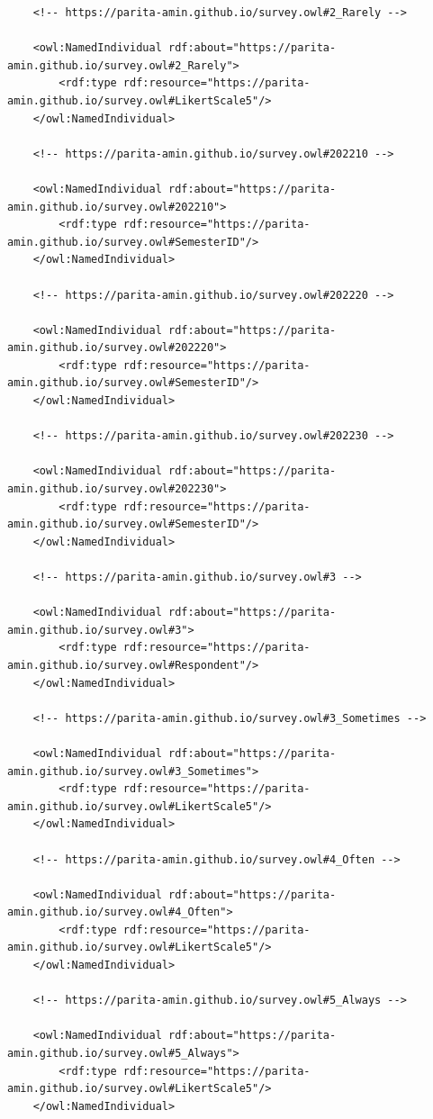 \begin{lstlisting}
    <!-- https://parita-amin.github.io/survey.owl#2_Rarely -->

    <owl:NamedIndividual rdf:about="https://parita-amin.github.io/survey.owl#2_Rarely">
        <rdf:type rdf:resource="https://parita-amin.github.io/survey.owl#LikertScale5"/>
    </owl:NamedIndividual>
    
    <!-- https://parita-amin.github.io/survey.owl#202210 -->

    <owl:NamedIndividual rdf:about="https://parita-amin.github.io/survey.owl#202210">
        <rdf:type rdf:resource="https://parita-amin.github.io/survey.owl#SemesterID"/>
    </owl:NamedIndividual>
    
    <!-- https://parita-amin.github.io/survey.owl#202220 -->

    <owl:NamedIndividual rdf:about="https://parita-amin.github.io/survey.owl#202220">
        <rdf:type rdf:resource="https://parita-amin.github.io/survey.owl#SemesterID"/>
    </owl:NamedIndividual>
    
    <!-- https://parita-amin.github.io/survey.owl#202230 -->

    <owl:NamedIndividual rdf:about="https://parita-amin.github.io/survey.owl#202230">
        <rdf:type rdf:resource="https://parita-amin.github.io/survey.owl#SemesterID"/>
    </owl:NamedIndividual>
    
    <!-- https://parita-amin.github.io/survey.owl#3 -->

    <owl:NamedIndividual rdf:about="https://parita-amin.github.io/survey.owl#3">
        <rdf:type rdf:resource="https://parita-amin.github.io/survey.owl#Respondent"/>
    </owl:NamedIndividual>
    
    <!-- https://parita-amin.github.io/survey.owl#3_Sometimes -->

    <owl:NamedIndividual rdf:about="https://parita-amin.github.io/survey.owl#3_Sometimes">
        <rdf:type rdf:resource="https://parita-amin.github.io/survey.owl#LikertScale5"/>
    </owl:NamedIndividual>
    
    <!-- https://parita-amin.github.io/survey.owl#4_Often -->

    <owl:NamedIndividual rdf:about="https://parita-amin.github.io/survey.owl#4_Often">
        <rdf:type rdf:resource="https://parita-amin.github.io/survey.owl#LikertScale5"/>
    </owl:NamedIndividual>
    
    <!-- https://parita-amin.github.io/survey.owl#5_Always -->

    <owl:NamedIndividual rdf:about="https://parita-amin.github.io/survey.owl#5_Always">
        <rdf:type rdf:resource="https://parita-amin.github.io/survey.owl#LikertScale5"/>
    </owl:NamedIndividual>
    

\end{lstlisting}
